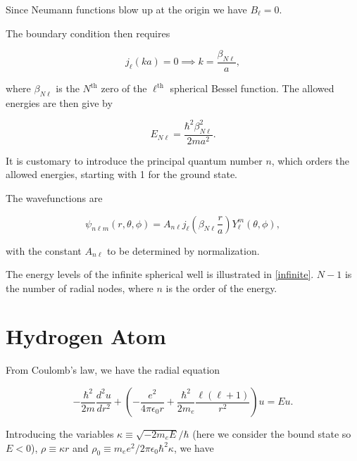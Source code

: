 \documentclass[a4paper,12pt]{report}
\begin{document}
{Since Neumann functions blow up at the origin we have \(B_{\ell } = 0\).

The boundary condition then requires 

\begin{equation}
  j_{\ell }(ka) = 0 \implies k = \frac{\beta _{N \ell } }{a},  
\end{equation}

where \(\beta _{N \ell } \) is the \(N^{\text{th}} \) zero of the \(\ell^{\text{th}} \) spherical Bessel function. The allowed energies are then give by 

\begin{equation}
  E_{N \ell } = \frac{\hbar ^2 \beta _{N \ell }^2 }{2ma^2}.  
\end{equation}

It is customary to introduce the principal quantum number \(n\), which orders the allowed energies, starting with 1 for the ground state.

The wavefunctions are 

\begin{equation}
  \psi _{n\ell m}(r,\theta ,\phi ) = A_{n \ell }j_{\ell } \left( \beta _{N \ell }\frac{r}{a}   \right)  Y_{\ell }^{m}(\theta ,\phi ),  
\end{equation}

with the constant \(A_{n\ell } \)  to be determined by normalization. 

The energy levels of the infinite spherical well is illustrated in \cref{infinite}. \(N-1\) is the number of radial nodes, where \(n\) is the order of the energy.  
}


\section{Hydrogen Atom}

From Coulomb's law, we have the radial equation

\begin{equation}
  -\frac{\hbar ^2}{2m} \frac{d^2u}{dr^2} + \left( - \frac{e^2}{4\pi \epsilon_0 r} + \frac{\hbar ^2}{2m_{e} } \frac{\ell (\ell +1)}{r^2}   \right)u = Eu. 
\end{equation}

Introducing the variables \(\kappa \equiv \sqrt{-2m_{e} E} /\hbar \) (here we consider the bound state so \(E <0\)), \(\rho \equiv \kappa r\) and \(\rho _{0}\equiv m_{e}e^2 /2\pi \epsilon_0 \hbar ^2 \kappa  \), we have
\end{document}
